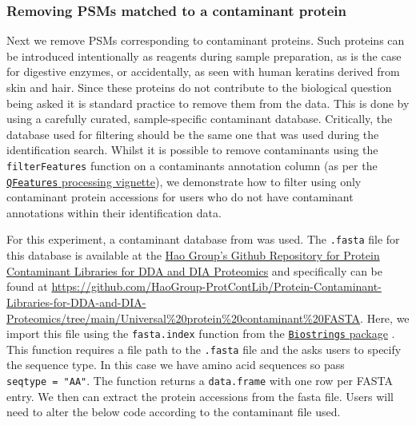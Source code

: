 \documentclass[9pt,a4paper,]{extarticle}
\begin{document}
\subsubsection{Removing PSMs matched to a contaminant protein}\label{removing-psms-matched-to-a-contaminant-protein}

Next we remove PSMs corresponding to contaminant proteins. Such proteins can be
introduced intentionally as reagents during sample preparation, as is the case
for digestive enzymes, or accidentally, as seen with human keratins derived from
skin and hair. Since these proteins do not contribute to the biological question
being asked it is standard practice to remove them from the data. This is
done by using a carefully curated, sample-specific contaminant database.
Critically, the database used for filtering should be the same one that was used
during the identification search. Whilst it is possible to remove contaminants
using the \texttt{filterFeatures} function on a contaminants annotation column (as per
the \href{https://bioconductor.org/packages/release/bioc/vignettes/QFeatures/inst/doc/Processing.html}{\texttt{QFeatures} processing vignette}),
we demonstrate how to filter using only contaminant protein accessions for users
who do not have contaminant annotations within their identification data.

For this experiment, a contaminant database from \citep{Frankenfield2022} was used.
The \texttt{.fasta} file for this database is available at the \href{Protein\%20Contaminant\%20Libraries\%20for\%20DDA\%20and\%20DIA\%20Proteomics}{Hao Group's Github Repository for Protein Contaminant Libraries for DDA and DIA Proteomics}
and specifically can be found at \url{https://github.com/HaoGroup-ProtContLib/Protein-Contaminant-Libraries-for-DDA-and-DIA-Proteomics/tree/main/Universal\%20protein\%20contaminant\%20FASTA}.
Here, we import this file using the \texttt{fasta.index} function from the
\href{https://bioconductor.org/packages/release/bioc/html/Biostrings.html}{\texttt{Biostrings} package}
\citep{biostrings}. This function requires a file path to the \texttt{.fasta} file and the
asks users to specify the sequence type. In this case we have amino acid
sequences so pass \texttt{seqtype\ =\ "AA"}. The function returns a \texttt{data.frame} with one
row per FASTA entry. We then can extract the protein accessions from the fasta
file. Users will need to alter the below code according to the contaminant file
used.
\end{document}
